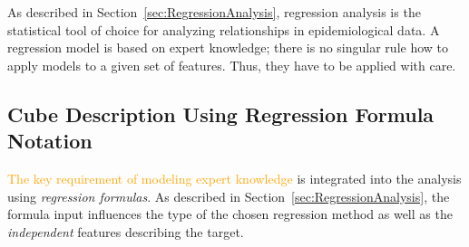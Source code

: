 \documentclass[journal]{style/vgtc} 			          %
\newcommand{\design}[1]{\textcolor{orange}{#1}}
\begin{document}
As described in Section~\ref{sec:RegressionAnalysis}, regression analysis is the statistical tool of choice for analyzing relationships in epidemiological data.
A regression model is based on expert knowledge; there is no singular rule how to apply models to a given set of features. Thus, they have to be applied with care.
\subsection{Cube Description Using Regression Formula Notation}
\design{The key requirement of modeling expert knowledge} is integrated into the analysis using \emph{regression formulas}.
As described in Section~\ref{sec:RegressionAnalysis}, the formula input influences the type of the chosen regression method as well as the \emph{independent} features describing the target.
\end{document}
